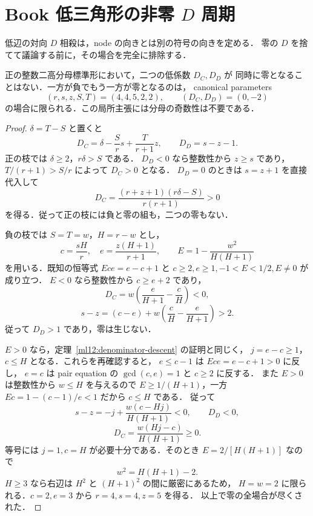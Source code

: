 \section{Book 低三角形の非零 \texorpdfstring{$D$}{D} 周期}
\label{bd20:section}

低辺の対向 $D$ 相殺は，node の向きとは別の符号の向きを定める．
零の $D$ を捨てて議論する前に，その場合を完全に排除する．

\begin{lemma}[低係数の零と負の隣接]
\label{bd20:local-zero}
正の整数二高分母標準形において，二つの低係数 $D_C,D_D$ が
同時に零となることはない．一方が負でもう一方が零となるのは，
canonical parameters
\begin{equation}\label{bd20:unique-zero}
 (r,s,z,S,T)=(4,4,5,2,2),\qquad (D_C,D_D)=(0,-2)
\end{equation}
の場合に限られる．この局所主張には分母の奇数性は不要である．
\end{lemma}

\begin{proof}
$\delta=T-S$ と置くと
\[
 D_C=\delta-\frac Sr s+\frac T{r+1}z,\qquad
 D_D=s-z-1.
\]
正の枝では $\delta\ge2$，$r\delta>S$ である．
$D_D<0$ なら整数性から $z\ge s$ であり，
$T/(r+1)>S/r$ によって $D_C>0$ となる．
$D_D=0$ のときは $s=z+1$ を直接代入して
\begin{equation}\label{bd20:positive-zero-identity}
 D_C=\frac{(r+z+1)(r\delta-S)}{r(r+1)}>0
\end{equation}
を得る．従って正の枝には負と零の組も，二つの零もない．

負の枝では $S=T=w$，$H=r-w$ とし，
\[
 c=\frac{sH}{r},\quad e=\frac{z(H+1)}{r+1},\qquad
 E=1-\frac{w^2}{H(H+1)}
\]
を用いる．既知の恒等式 $Ece=e-c+1$ と
$c\ge2,e\ge1,-1<E<1/2,E\ne0$ が成り立つ．
$E<0$ なら整数性から $c\ge e+2$ であり，
\[
 D_C=w\left(\frac e{H+1}-\frac cH\right)<0,
\]
\[
 s-z=(c-e)+w\left(\frac cH-\frac e{H+1}\right)>2.
\]
従って $D_D>1$ であり，零は生じない．

$E>0$ なら，定理~\ref{ml12:denominator-descent} の証明と同じく，
$j=e-c\ge1$，$c\le H$ となる．これらを再確認すると，
$e\le c-1$ は $Ece=e-c+1>0$ に反し，
$e=c$ は pair equation の $\gcd(c,e)=1$ と $c\ge2$ に反する．
また $E>0$ は整数性から $w\le H$ を与えるので
$E\ge1/(H+1)$，一方 $Ec=1-(c-1)/e<1$ だから $c\le H$ である．
従って
\[
 s-z=-j+\frac{w(c-Hj)}{H(H+1)}<0,\qquad D_D<0,
\]
\begin{equation}\label{bd20:negative-low-D}
 D_C=\frac{w(Hj-c)}{H(H+1)}\ge0.
\end{equation}
等号には $j=1,c=H$ が必要十分である．そのとき
$E=2/[H(H+1)]$ なので
\[
 w^2=H(H+1)-2.
\]
$H\ge3$ なら右辺は $H^2$ と $(H+1)^2$ の間に厳密にあるため，
$H=w=2$ に限られる．$c=2,e=3$ から $r=4,s=4,z=5$ を得る．
以上で零の全場合が尽くされた．
\end{proof}

